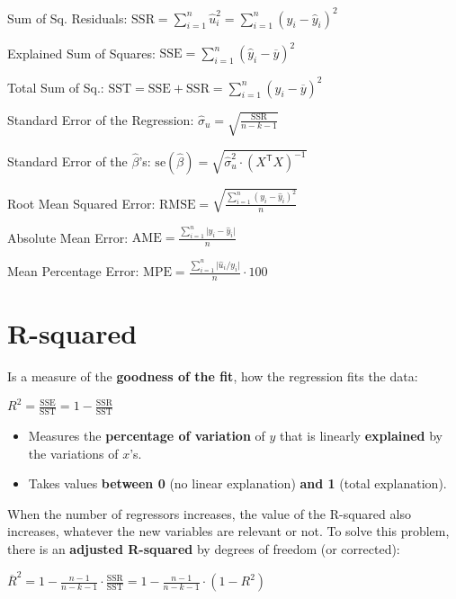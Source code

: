 \documentclass[10pt, a4paper, landscape]{article}
\newcommand{\se}{\mathrm{se}}
\newcommand{\SSR}{\mathrm{SSR}}
\newcommand{\SSE}{\mathrm{SSE}}
\newcommand{\SST}{\mathrm{SST}}
\newcommand{\tr}{\mathsf{T}}
\begin{document}
\begin{multicols}{3}
		Sum of Sq. Residuals: \hfill $\SSR = \sum_{i=1}^{n} \hat{u}_{i}^{2} = \sum_{i=1}^{n} (y_{i} - \hat{y}_{i})^{2}$
		
		Explained Sum of Squares: \hfill $\SSE = \sum_{i=1}^{n} (\hat{y}_{i} - \overline{y})^{2}$
		
		Total Sum of Sq.: \hfill $\SST = \SSE + \SSR = \sum_{i=1}^{n} (y_{i} - \overline{y})^{2}$
		
		Standard Error of the Regression: \hfill $\hat{\sigma}_{u} = \sqrt{\frac{\SSR}{n - k - 1}}$
		
		Standard Error of the $\hat{\beta}$'s: \hfill $\se(\hat{\beta}) = \sqrt{\hat{\sigma}^{2}_{u} \cdot (X^{\tr} X)^{-1}}$
		
		Root Mean Squared Error: \hfill $\mathrm{RMSE} = \sqrt{\frac{\sum_{i=1}^{n}(y_{i} - \hat{y}_{i})^{2}}{n}}$
		
		Absolute Mean Error: \hfill $\mathrm{AME} = \frac{\sum_{i=1}^{n} \lvert y_{i} - \hat{y}_{i} \rvert}{n}$
		
		Mean Percentage Error: \hfill $\mathrm{MPE} = \frac{\sum_{i=1}^{n} \lvert \hat{u}_{i} / y_{i} \rvert}{n} \cdot 100$
		
		\columnbreak
		
		\section*{R-squared}
		
		Is a measure of the \textbf{goodness of the fit}, how the regression fits the data:
		
		\begin{center}
			$R^{2} = \frac{\SSE}{\SST} = 1 - \frac{\SSR}{\SST}$
		\end{center}
		
		\begin{itemize}[leftmargin=*]
			\item Measures the \textbf{percentage of variation} of $y$ that is linearly \textbf{explained} by the variations of $x$'s.
			\item Takes values \textbf{between 0} (no linear explanation) \textbf{and 1} (total explanation).
		\end{itemize}
		
		When the number of regressors increases, the value of the R-squared also increases, whatever the new variables are relevant or not. To solve this problem, there is an \textbf{adjusted R-squared} by degrees of freedom (or corrected):
		
		\begin{center}
			$\overline{R}^{2} = 1 - \frac{n - 1}{n - k - 1} \cdot \frac{\SSR}{\SST} = 1 - \frac{n - 1}{n - k - 1} \cdot (1 - R^{2})$
		\end{center}
		

\end{multicols}
\end{document}
